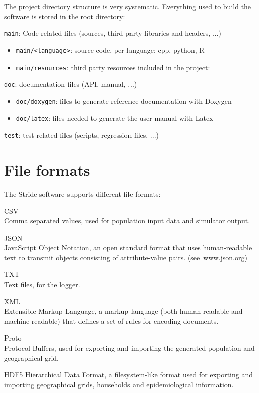 The project directory structure is very systematic.
Everything used to build the software is stored in the root directory:
\begin{compactitem}
    \item \texttt{main}: Code related files (sources, third party libraries and headers, ...)
      	\begin{itemize}
        		\item \texttt{main/<language>}: source code, per language: cpp, python, R
        		\item \texttt{main/resources}: third party resources included in the project:
        \end{itemize}
    \item \texttt{doc}: documentation files (API, manual, ...)
      	\begin{itemize}
        		\item \texttt{doc/doxygen}: files to generate reference documentation with Doxygen
        		\item \texttt{doc/latex}: files needed to generate the user manual with Latex
        \end{itemize}
    \item \texttt{test}: test related files (scripts, regression files, ...)
\end{compactitem}

\section{File formats}
\label{section:FileFormats}

The Stride software supports different file formats:
\begin{compactdesc}
	\item [CSV] \ \\
	Comma separated values, used for population input data and simulator output.
	\item [JSON] \ \\
	JavaScript Object Notation, an open standard format that uses human-readable text to transmit objects consisting of attribute-value pairs. 	 \mbox{(see \url{www.json.org})}
	\item [TXT] \ \\
	Text files, for the logger.
	\item [XML] \ \\
	Extensible Markup Language, a markup language (both human-readable and machine-readable) that defines a set of rules for encoding documents.
    \item [Proto] \ \\
    Protocol Buffers, used for exporting and importing the generated population and geographical grid.
    \item [HDF5]
    Hierarchical Data Format, a filesystem-like format used for exporting and importing geographical grids, households and epidemiological information. 
\end{compactdesc}


